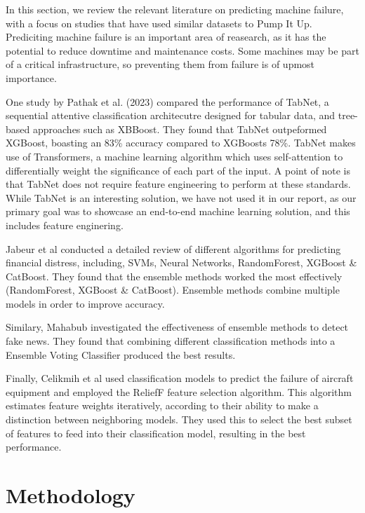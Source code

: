 \documentclass[conference]{IEEEtran}
\begin{document}
In this section, we review the relevant literature on predicting machine failure, with a focus on studies that have used similar datasets to Pump It Up. Prediciting machine failure is an important area of reasearch, as it has the potential to reduce downtime and maintenance costs. Some machines may be part of a critical infrastructure, so preventing them from failure is of upmost importance.

One study by Pathak et al. (2023) \cite{pathak2023pump} compared the performance of TabNet, a sequential attentive classification architecutre designed for tabular data, and tree-based approaches such as XBBoost. They found that TabNet outpeformed XGBoost, boasting an 83\% accuracy compared to XGBoosts 78\%. TabNet makes use of Transformers, a machine learning algorithm which uses self-attention to differentially weight the significance of each part of the input. A point of note is that TabNet does not require feature engineering to perform at these standards. While TabNet is an interesting solution, we have not used it in our report, as our primary goal was to showcase an end-to-end machine learning solution, and this includes feature enginering.

Jabeur et al \cite{JABEUR2021} conducted a detailed review of different algorithms for predicting financial distress, including, SVMs, Neural Networks, RandomForest, XGBoost \& CatBoost. They found that the ensemble methods worked the most effectively (RandomForest, XGBoost \& CatBoost). Ensemble methods combine multiple models in order to improve accuracy. 

Similary, Mahabub \cite{Mahabub2020} investigated the effectiveness of ensemble methods to detect fake news. They found that combining different classification methods into a Ensemble Voting Classifier produced the best results.

Finally, Celikmih et al \cite{celikmih2020} used classification models to predict the failure of aircraft equipment and employed the ReliefF feature selection algorithm. This algorithm estimates feature weights iteratively, according to their ability to make a distinction between neighboring models. They used this to select the best subset of features to feed into their classification model, resulting in the best performance.

\section{Methodology}
\end{document}
